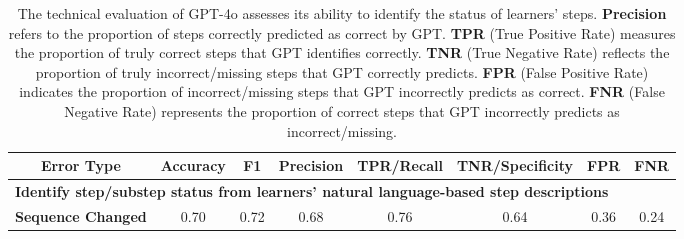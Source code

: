 





\begin{table*}[hbpt]
	\centering
	\caption{The technical evaluation of GPT-4o assesses its ability to identify the status of learners' steps. \textbf{Precision} refers to the proportion of steps correctly predicted as correct by GPT. \textbf{TPR} (True Positive Rate) measures the proportion of truly correct steps that GPT identifies correctly. \textbf{TNR} (True Negative Rate) reflects the proportion of truly incorrect/missing steps that GPT correctly predicts. \textbf{FPR} (False Positive Rate) indicates the proportion of incorrect/missing steps that GPT incorrectly predicts as correct. \textbf{FNR} (False Negative Rate) represents the proportion of correct steps that GPT incorrectly predicts as incorrect/missing.}
	\label{tab:technicalresult}%
	\begin{small}
	\begin{tabular}{c | c c c c c c c}
	    \hline
	    \textbf{Error Type}&Accuracy&F1&Precision&TPR/Recall&TNR/Specificity&FPR&FNR\\
	    \hline
 \hline
\multicolumn{8}{l}{\textbf{Identify step/substep status from learners' natural language-based step descriptions}}\\
\hline    
	    \textbf{Sequence Changed}&0.70&0.72&0.68&0.76&0.64&0.36&0.24\\
	

\end{tabular}
\end{small}
\end{table*}
